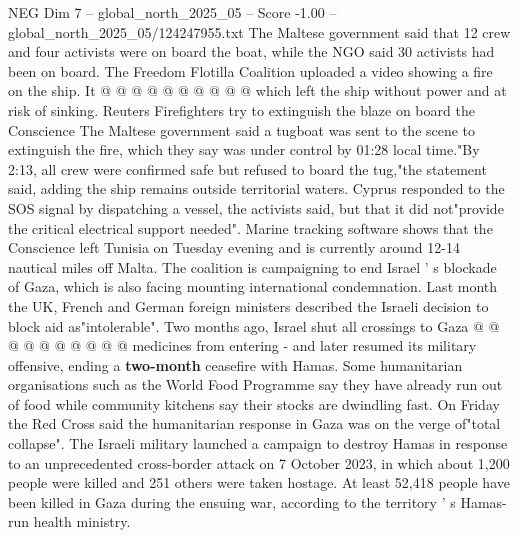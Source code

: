 \begin{textsample}{NEG Dim 7 – global\_north\_2025\_05 – Score -1.00 – global\_north\_2025\_05/124247955.txt}
The Maltese government said that 12 crew and four activists were on board the boat, while the NGO said 30 activists had been on board.
The Freedom Flotilla Coalition uploaded a video showing a fire on the ship.
It @ @ @ @ @ @ @ @ @ @ which left the ship without power and at risk of sinking.
Reuters Firefighters try to extinguish the blaze on board the Conscience The Maltese government said a tugboat was sent to the scene to extinguish the fire, which they say was under control by 01:28 local time."By 2:13, all crew were confirmed safe but refused to board the tug,"the statement said, adding the ship remains outside territorial waters.
Cyprus responded to the SOS signal by dispatching a vessel, the activists said, but that it did not"provide the critical electrical support needed".
Marine tracking software shows that the Conscience left Tunisia on Tuesday evening and is currently around 12-14 nautical miles off Malta.
The coalition is campaigning to end Israel ' s blockade of Gaza, which is also facing mounting international condemnation.
Last month the UK, French and German foreign ministers described the Israeli decision to block aid as"intolerable".
Two months ago, Israel shut all crossings to Gaza @ @ @ @ @ @ @ @ @ @ medicines from entering - and later resumed its military offensive, ending a \textbf{two-month} ceasefire with Hamas.
Some humanitarian organisations such as the World Food Programme say they have already run out of food while community kitchens say their stocks are dwindling fast.
On Friday the Red Cross said the humanitarian response in Gaza was on the verge of"total collapse".
The Israeli military launched a campaign to destroy Hamas in response to an unprecedented cross-border attack on 7 October 2023, in which about 1,200 people were killed and 251 others were taken hostage.
At least 52,418 people have been killed in Gaza during the ensuing war, according to the territory ' s Hamas-run health ministry.

\end{textsample}
